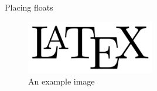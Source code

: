 \documentclass{article}
\begin{document}
Placing floats

\lipsum[1-7]
\begin{figure}[H] %
    \centering
    \includegraphics[width=0.5\textwidth]{LaTeX_logo.svg.png}
    \caption{An example image}
\end{figure}
\lipsum[8-15]

\end{document}

